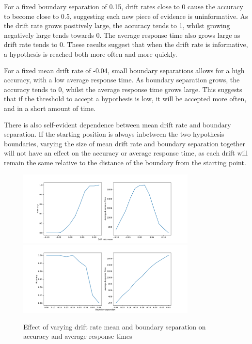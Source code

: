 \documentclass{article}
\begin{document}
For a fixed boundary separation of 0.15, drift rates close to 0 cause the accuracy to become close to 0.5, suggesting each new piece of evidence is uninformative. As the drift rate grows positively large, the accuracy tends to 1, whilst growing negatively large tends towards 0. The average response time also grows large as drift rate tends to 0. These results suggest that when the drift rate is informative, a hypothesis is reached both more often and more quickly.

For a fixed mean drift rate of -0.04, small boundary separations allows for a high accuracy, with a low average response time. As boundary separation grows, the accuracy tends to 0, whilst the average response time grows large. This suggests that if the threshold to accept a hypothesis is low, it will be accepted more often, and in a short amount of time.

There is also self-evident dependence between mean drift rate and boundary separation. If the starting position is always inbetween the two hypothesis boundaries, varying the size of mean drift rate and boundary separation together will not have an effect on the accuracy or average response time, as each drift will remain the same relative to the distance of the boundary from the starting point.

\begin{figure}[H]
  \centering
  \includegraphics[width=0.8\textwidth]{figures/part1/task2/varying_drift_rate_mean.pdf}
  \label{fig:varyingdriftratemean}
  \includegraphics[width=0.8\textwidth]{figures/part1/task2/varying_boundary_separation.pdf}
  \caption{Effect of varying drift rate mean and boundary separation on accuracy and average response times}
  \label{fig:varyingboundaryseparation}
\end{figure}
\end{document}
